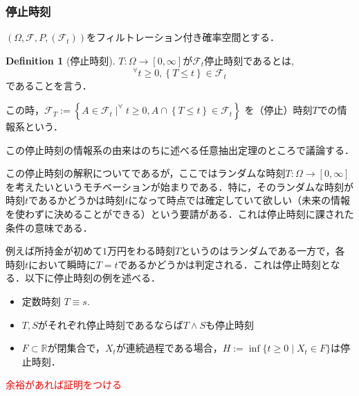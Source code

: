 \documentclass{jsarticle}
\theoremstyle{definition}
\newtheorem{dfn}{Definition}[section]
\begin{document}
\subsubsection{停止時刻}
$(\Omega, \mathscr{F}, P, \left(\mathscr{F}_t\right))$をフィルトレーション付き確率空間とする．

\begin{dfn}[停止時刻]
    $T: \Omega \rightarrow [0, \infty]$が$\mathscr{F}_t$停止時刻であるとは,
    $$^\forall t \geq 0, \left\{T \leq t\right\} \in \mathscr{F}_t$$
    であることを言う．\par
    この時，$\mathscr{F}_T := \left\{A\in \mathscr{F}_t \mid ^\forall t \geq 0, A\cap \left\{T \leq t\right\} \in \mathscr{F}_t\right\}$
    を（停止）時刻$T$での情報系という．
\end{dfn}
この停止時刻の情報系の由来はのちに述べる任意抽出定理のところで議論する．\par
この停止時刻の解釈についてであるが，ここではランダムな時刻$T: \Omega \rightarrow [0, \infty]$を考えたいというモチベーションが始まりである．特に，そのランダムな時刻が時刻$t$であるかどうかは時刻$t$になって時点では確定していて欲しい（未来の情報を使わずに決めることができる）という要請がある．これは停止時刻に課された条件の意味である．\par
例えば所持金が初めて$1$万円をわる時刻$T$というのはランダムである一方で，各時刻$t$において瞬時に$T= t$であるかどうかは判定される．これは停止時刻となる．以下に停止時刻の例を述べる．

\begin{itemize}
    \item 定数時刻 $T\equiv s$.
    \item $T, S$がそれぞれ停止時刻であるならば$T\land S$も停止時刻
    \item $F\subset \mathbb{R}$が閉集合で，$X_t$が連続過程である場合，$H := \inf\{t \geq 0 \mid X_t \in F\}$は停止時刻．
\end{itemize}
\textcolor{red}{余裕があれば証明をつける}
\end{document}
